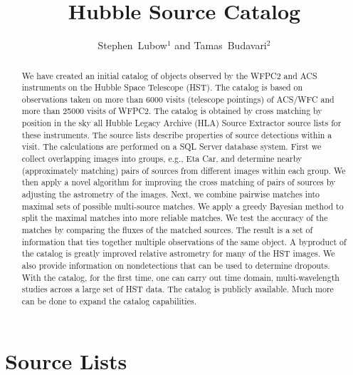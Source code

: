 
\resetcounters




\title{Hubble Source Catalog}
\author{Stephen~Lubow$^1$ and Tamas~Budavari$^2$
}


\begin{abstract}
We have created an initial catalog of objects observed by the WFPC2 and ACS instruments on the Hubble Space Telescope (HST). The catalog is based on observations taken on more than 6000 visits (telescope pointings) of ACS/WFC and more than 25000 visits of WFPC2. The catalog is obtained by cross matching by position in the sky all Hubble Legacy Archive (HLA) Source Extractor source lists for these instruments. The source lists describe properties of source detections within a visit. The calculations are performed on a SQL Server database system. First we collect overlapping images into groups, e.g., Eta Car, and determine nearby (approximately matching) pairs of sources from different images within each group. We then apply a novel algorithm for improving the cross matching of pairs of sources by adjusting the astrometry of the images. Next, we combine pairwise matches into maximal sets of possible multi-source matches. 
We apply a greedy Bayesian method to split the maximal matches into more reliable matches. We test the accuracy of the matches by comparing the fluxes of the matched sources. The result is a set of information that ties together multiple observations of the same object. A byproduct of the catalog is greatly improved relative astrometry for many of the HST images. We also provide information on nondetections that can be used to determine dropouts. With the catalog, for the first time, one can carry out time domain, multi-wavelength studies across a large set of HST data. The catalog is publicly available. Much more can be done to expand the catalog capabilities.

\end{abstract}

\section{Source Lists}

